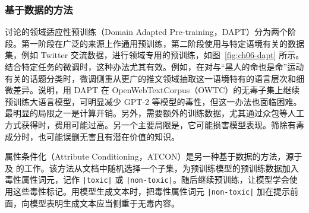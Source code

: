 \subsubsection{基于数据的方法}
讨论的领域适应性预训练（Domain Adapted Pre-training，DAPT）分为两个阶段。第一阶段在广泛的来源上作通用预训练，第二阶段使用与特定语境有关的数据集，例如 Twitter 交流数据，进行领域专用的预训练，如图~\ref{fig:ch06-dapt} 所示。结合特定任务的微调时，这种办法尤其有效。例如，在对与“黑人的命也是命”运动有关的话题分类时，微调侧重从更广的推文领域抽取这一语境特有的语言层次和细微差异。说明，用 DAPT 在 OpenWebTextCorpus（OWTC）的无毒子集上继续预训练大语言模型，可明显减少 GPT-2 等模型的毒性，但这一办法也面临困难。最明显的局限之一是计算开销。另外，需要额外的训练数据，尤其通过众包等人工方式获得时，费用可能过高。另一个主要局限是，它可能损害模型表现。筛除有毒成分时，也可能误删无害且有潜在价值的知识。


属性条件化（Attribute Conditioning，ATCON）是另一种基于数据的方法，源于 及 的工作。该方法从文档中随机选择一个子集，为预训练模型的预训练数据加入毒性属性词元，记作 \verb!|toxic|! 或 \verb!|non-toxic|!。随后继续预训练，让模型学会使用这些毒性标记。用模型生成文本时，把毒性属性词元 \verb!|non-toxic|! 加在提示前面，向模型表明生成文本应当侧重于无毒内容。


